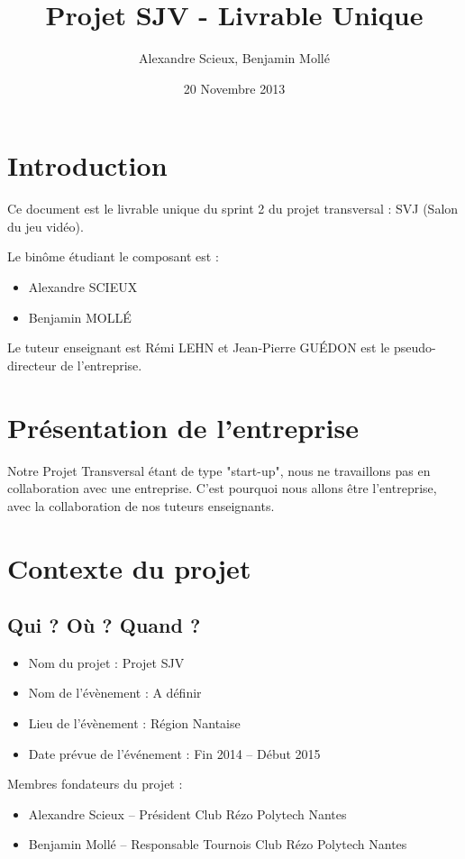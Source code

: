 \documentclass[french]{article}
\title{Projet SJV - Livrable Unique}
\author{Alexandre Scieux, Benjamin Mollé}
\date{20 Novembre 2013}
\begin{document}
\maketitle
\tableofcontents

\newpage
\section{Introduction}

Ce document est le livrable unique du sprint 2 du projet transversal : SVJ (Salon du jeu vidéo).

Le binôme étudiant le composant est :
\begin{itemize}
	\item Alexandre SCIEUX
	\item Benjamin MOLLÉ
\end{itemize}

Le tuteur enseignant est Rémi LEHN et Jean-Pierre GUÉDON est le pseudo-directeur de l'entreprise.

\section{Présentation de l'entreprise}

Notre Projet Transversal étant de type "start-up", nous ne travaillons pas en collaboration avec une entreprise. C'est pourquoi nous allons être l'entreprise, avec la collaboration de nos tuteurs enseignants.

\section{Contexte du projet}

\subsection{Qui ? Où ? Quand ?}
\begin{itemize}
	\item Nom du projet : Projet SJV
	\item Nom de l'évènement : A définir
	\item Lieu de l'évènement : Région Nantaise
	\item Date prévue de l'événement : Fin 2014 – Début 2015
\end{itemize}

Membres fondateurs du projet :
\begin{itemize}
	\item Alexandre Scieux – Président Club Rézo Polytech Nantes
	\item Benjamin Mollé – Responsable Tournois Club Rézo Polytech Nantes
\end{itemize}
\end{document}
